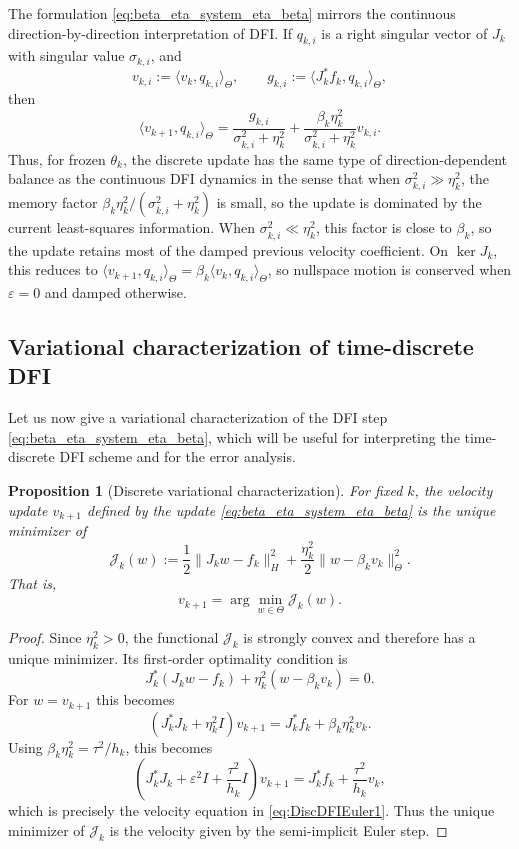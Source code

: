 \documentclass[oneside,11pt]{article}
\newtheorem{proposition}{Proposition}
\theoremstyle{remark}
\theoremstyle{thmstyleone}
\theoremstyle{thmstylethree}
\theoremstyle{thmstyletwo}
\newcommand{\ip}[2]{\langle #1,#2\rangle}
\newcommand{\norm}[1]{\lVert #1\rVert}
\newcommand{\mcJ}{\mathcal{J}}
\begin{document}
The formulation \eqref{eq:beta_eta_system_eta_beta} mirrors the continuous direction-by-direction interpretation of DFI. 
If $q_{k,i}$ is a right singular vector of $J_k$ with singular value $\sigma_{k,i}$, and
\[
  v_{k,i}:=\ip{v_k}{q_{k,i}}_\Theta,
  \qquad
  g_{k,i}:=\ip{J_k^*f_k}{q_{k,i}}_\Theta,
\]
then
\[
  \ip{v_{k+1}}{q_{k,i}}_\Theta
  =
  \frac{g_{k,i}}{\sigma_{k,i}^2+\eta_k^2}
  +
  \frac{\beta_k\eta_k^2}{\sigma_{k,i}^2+\eta_k^2}v_{k,i}.
\]
Thus, for frozen $\theta_k$, the discrete update has the same type of direction-dependent balance as the continuous DFI dynamics in the sense that when $\sigma_{k,i}^2\gg\eta_k^2$, the memory factor $\beta_k\eta_k^2/(\sigma_{k,i}^2+\eta_k^2)$ 
is small, so the update is dominated by the current least-squares information. When $\sigma_{k,i}^2\ll\eta_k^2$, this factor is close to $\beta_k$, so the update retains most of the damped previous velocity coefficient.  
On $\ker J_k$, this reduces to $\ip{v_{k+1}}{q_{k,i}}_\Theta=\beta_k\ip{v_k}{q_{k,i}}_\Theta$, so nullspace motion is conserved when $\varepsilon=0$ and damped otherwise.

\subsection{Variational characterization of time-discrete DFI}
Let us now give a variational characterization of the DFI step \eqref{eq:beta_eta_system_eta_beta}, which will be useful for interpreting  the time-discrete DFI scheme and for the error analysis.

\begin{proposition}[Discrete variational characterization]
          \label{prop:discrete_variational_characterization}
          For fixed $k$, the velocity update $v_{k + 1}$ defined by the update \eqref{eq:beta_eta_system_eta_beta} is the unique minimizer of 
\begin{equation}
  \mcJ_k(w)
  :=
  \frac12\norm{J_kw-f_k}_H^2
  +
  \frac{\eta_k^2}{2}\norm{w-\beta_kv_k}_\Theta^2 .
  \label{eq:Jk_main_shifted}
\end{equation}
That is,  \begin{equation}
            v_{k+1}=\arg\min_{w\in \Theta}\mcJ_k(w) .
            \label{eq:main_minimization}
          \end{equation}
        \end{proposition}

\begin{proof}
         Since $\eta_k^2>0$, the functional $\mcJ_k$ is strongly convex and therefore has a unique minimizer. 
Its first-order optimality condition is
\[
  J_k^*(J_kw-f_k)+\eta_k^2(w-\beta_kv_k)=0 .
\]
For $w=v_{k+1}$ this becomes
\[
  (J_k^*J_k+\eta_k^2I)v_{k+1}
  =
  J_k^*f_k+\beta_k\eta_k^2v_k .
\]
Using $\beta_k\eta_k^2=\tau^2/h_k$, this becomes
\[
\left(J_k^*J_k+\varepsilon^2I+\frac{\tau^2}{h_k}I\right)v_{k+1}
=
J_k^*f_k+\frac{\tau^2}{h_k}v_k,
\]
which is precisely the velocity equation in \eqref{eq:DiscDFIEuler1}. 
Thus the unique minimizer of $\mcJ_k$ is the velocity given by the semi-implicit Euler step.
\end{proof}
\end{document}
